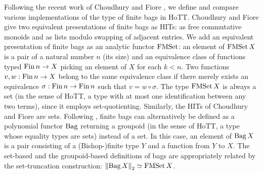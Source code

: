 \documentclass[final,a4paper,USenglish,cleveref]{lipics-v2021}
\begin{document}
Following the recent work of Choudhury and Fiore \cite{Choudhury2023}, we define and compare various implementations of the type of finite bags in HoTT. Choudhury and Fiore give two equivalent presentations of finite bags as HITs: as free commutative monoids and as lists modulo swapping of adjacent entries. We add an equivalent presentation of finite bags as an analytic functor $\FMSet$: an element of $\FMSet X$ is a pair of a natural number $n$ (its size) and an equivalence class of functions typed $\Fin n \to X$ picking an element of $X$ for each $k < n$. Two functions $v ,w :\Fin n \to X$ belong to the same equivalence class if there merely exists an equivalence $\sigma : \Fin n \to \Fin n$ such that $v = w \circ \sigma$. The type $\FMSet X$ is always a set (in the sense of HoTT, \ie a type with at most one identification between any two terms), since it employs set-quotienting. Similarly, the HITs of Choudhury and Fiore are sets. Following \cite{Kock2012}, finite bags can alternatively be defined as a polynomial functor $\Bag$ returning a groupoid (in the sense of HoTT, \ie a type whose equality types are sets) instead of a set. In this case, an element of $\Bag X$ is a pair consisting of a (Bishop-)finite type $Y$ and a function from $Y$ to $X$. The set-based and the groupoid-based definitions of bags are appropriately related by the set-truncation construction: $\SetTrunc{\Bag X} \simeq \FMSet X$.
\end{document}
